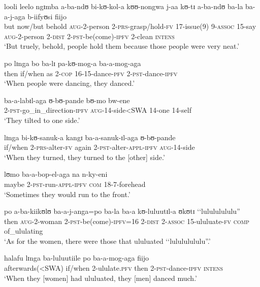 \begin{exe}
\ex \gll looli leelo ngɪmba a-ba-ndʊ bi-kʊ-kol-a kʊʊ-nongwa j-aa kʊ-tɪ a-ba-ndʊ ba-la ba-a-j-aga b-iifyʊsi fiijo\\
but now/but behold \textsc{aug}-2-person 2-\textsc{prs}-grasp/hold-\textsc{fv} 17-issue(9) 9-\textsc{assoc} 15-say \textsc{aug}-2-person 2-\textsc{dist} 2-\textsc{pst}-be(come)-\textsc{ipfv} 2-clean \textsc{intens}\\
\glt \lq But truely, behold, people hold them because those people were very neat.'

\ex \gll po lɪnga bo ba-lɪ pa-kʊ-mog-a ba-a-mog-aga\\
then if/when as 2-\textsc{cop} 16-15-dance-\textsc{pfv} 2-\textsc{pst}-dance-\textsc{ipfv}\\
\glt \lq When people were dancing, they danced.'

\ex \gll ba-a-labɪl-aga ʊ-bʊ-pande bʊ-mo bw-ene\\
2-\textsc{pst}-go\_in\_direction-\textsc{ipfv} \textsc{aug}-14-side<SWA 14-one 14-self\\
\glt \lq They tilted to one side.'

\ex \gll lɪnga bi-kʊ-sanuk-a kangɪ ba-a-sanuk-ɪl-aga ʊ-bʊ-pande\\
if/when 2-\textsc{prs}-alter-\textsc{fv} again 2-\textsc{pst}-alter-\textsc{appl}-\textsc{ipfv} \textsc{aug}-14-side\\
\glt \lq When they turned, they turned to the [other] side.'

\ex \gll lʊmo ba-a-bop-el-aga na n-ky-eni\\
maybe 2-\textsc{pst}-run-\textsc{appl}-\textsc{ipfv} \textsc{com} 18-7-forehead\\
\glt \lq Sometimes they would run to the front.'

\ex \gll po a-ba-kiikʊlʊ ba-a-j-anga=po ba-la ba-a kʊ-luluutɪl-a ʊkʊtɪ \lq\lq lulululululu''\\
then \textsc{aug}-2-woman 2-\textsc{pst}-be(come)-\textsc{ipfv}=16 2-\textsc{dist} 2-\textsc{assoc} 15-ululuate-\textsc{fv} \textsc{comp} \phantom{\lq\lq}of\_ululating\\
\glt \lq As for the women, there were those that ululuated \lq\lq lulululululu''.'

\ex \gll halafu lɪnga ba-luluutiile po ba-a-mog-aga fiijo\\
afterwards(<SWA) if/when 2-ululate.\textsc{pfv} then 2-\textsc{pst}-dance-\textsc{ipfv} \textsc{intens}\\
\glt \lq When they [women] had ululuated, they [men] danced much.'


\end{exe}
